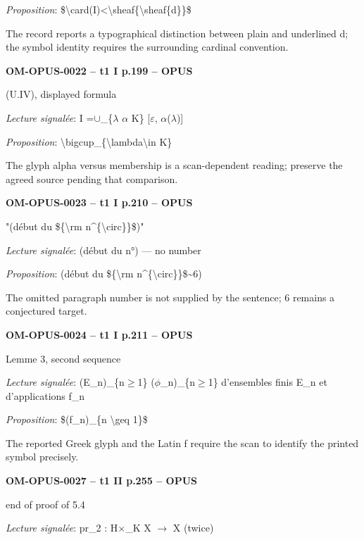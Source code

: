 \emph{Proposition}: \$\textbackslash{}card(I)<\textbackslash{}sheaf\{\textbackslash{}sheaf\{d\}\}\$\par
The record reports a typographical distinction between plain and underlined d; the symbol identity requires the surrounding cardinal convention.\par
\par\noindent\textbf{OM-OPUS-0022 -- t1 I p.199 -- OPUS}\par
(U.IV), displayed formula\par
\emph{Lecture signalée}: I =\allowbreak  \ensuremath{\cup}\_\{\ensuremath{\lambda} \ensuremath{\alpha} K\} [\ensuremath{\varepsilon}, \ensuremath{\alpha}(\ensuremath{\lambda})]\par
\emph{Proposition}: \textbackslash{}bigcup\_\{\textbackslash{}lambda\textbackslash{}in K\}\par
The glyph alpha versus membership is a scan-dependent reading; preserve the agreed source pending that comparison.\par
\par\noindent\textbf{OM-OPUS-0023 -- t1 I p.210 -- OPUS}\par
"(début du \$\{\textbackslash{}rm n\textasciicircum{}\{\textbackslash{}circ\}\}\$)"\par
\emph{Lecture signalée}: (début du n°) — no number\par
\emph{Proposition}: (début du \$\{\textbackslash{}rm n\textasciicircum{}\{\textbackslash{}circ\}\}\$\textasciitilde{}6)\par
The omitted paragraph number is not supplied by the sentence; 6 remains a conjectured target.\par
\par\noindent\textbf{OM-OPUS-0024 -- t1 I p.211 -- OPUS}\par
Lemme 3, second sequence\par
\emph{Lecture signalée}: (E\_n)\_\{n\ensuremath{\geq}1\} (\ensuremath{\phi}\_n)\_\{n\ensuremath{\geq}1\} d'ensembles finis E\_n et d'applications f\_n\par
\emph{Proposition}: \$(f\_n)\_\{n \textbackslash{}geq 1\}\$\par
The reported Greek glyph and the Latin f require the scan to identify the printed symbol precisely.\par
\par\noindent\textbf{OM-OPUS-0027 -- t1 II p.255 -- OPUS}\par
end of proof of 5.4\par
\emph{Lecture signalée}: pr\_2 : H\ensuremath{\times}\_K X \ensuremath{\to} X (twice)\par
